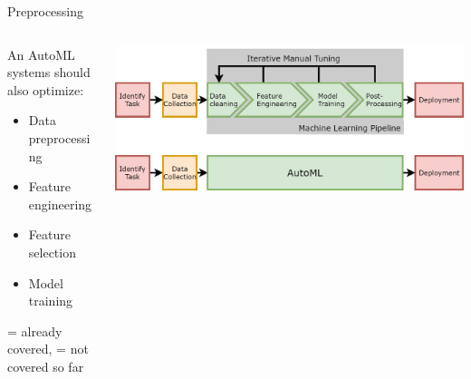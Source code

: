 	\begin{frame}[c]{Preprocessing}
		\begin{columns}
			\begin{column}{0.5\textwidth} 
				An AutoML systems should also optimize: 
				\begin{itemize}
					\item[\ding{55}] Data preprocessing
					\item[\ding{55}] Feature engineering
					\item[\ding{55}] Feature selection
					\item[\ding{51}] Model training
				\end{itemize}
				\vspace{1em}
				{\tiny {} = already covered,  = not covered so far}
			\end{column}%
			\begin{column}{0.5\textwidth}
				\begin{center}
					\includegraphics[width = \linewidth]{images/AutoMLPipeline.jpg}  
				\end{center}
			\end{column}
		\end{columns}
		
	\end{frame}
	
